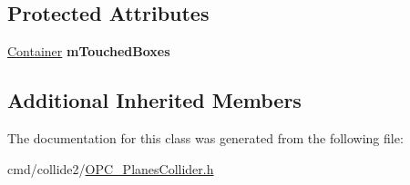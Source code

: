 \subsection*{Protected Attributes}
\begin{DoxyCompactItemize}
\item 
\hyperlink{classContainer}{Container} {\bfseries m\+Touched\+Boxes}\hypertarget{classHybridPlanesCollider_a809382e70d112fcaabd71f0b8cc5754f}{}\label{classHybridPlanesCollider_a809382e70d112fcaabd71f0b8cc5754f}

\end{DoxyCompactItemize}
\subsection*{Additional Inherited Members}


The documentation for this class was generated from the following file\+:\begin{DoxyCompactItemize}
\item 
cmd/collide2/\hyperlink{OPC__PlanesCollider_8h}{O\+P\+C\+\_\+\+Planes\+Collider.\+h}\end{DoxyCompactItemize}
